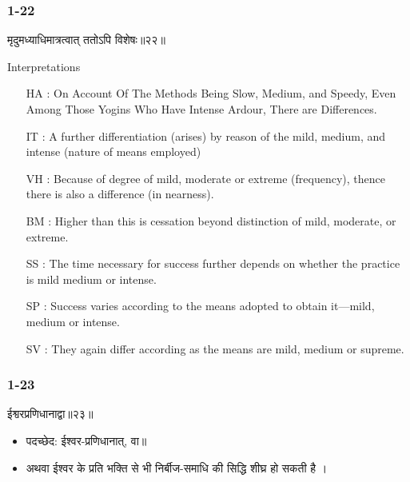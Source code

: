 \begin{frame}[fragile]\frametitle{1-22}
\begin{sanskrit}
मृदुमध्याधिमात्रत्वात् ततोऽपि विशेषः॥२२॥
\end{sanskrit}

Interpretations
\begin{itemize}	
\item [HA]: On Account Of The Methods Being Slow, Medium, and Speedy, Even Among Those Yogins Who Have Intense Ardour, There are Differences.
\item [IT]: A further differentiation (arises) by reason of the mild, medium, and intense (nature of means employed)
\item [VH]: Because of degree of mild, moderate or extreme (frequency), thence there is also a difference (in nearness).
\item [BM]: Higher than this is cessation beyond distinction of mild, moderate, or extreme.
\item [SS]: The time necessary for success further depends on whether the practice is mild medium or intense.
\item [SP]: Success varies according to the means adopted to obtain it—mild, medium or intense.
\item [SV]: They again differ according as the means are mild, medium or supreme. 
\end{itemize}
	
\end{frame}


\begin{frame}[fragile]\frametitle{1-23}
\begin{sanskrit}
ईश्वरप्रणिधानाद्वा॥२३॥
\end{sanskrit}

\begin{itemize}
\item पदच्छेद: ईश्वर-प्रणिधानात्, वा॥
\item अथवा ईश्वर के प्रति भक्ति से भी निर्बीज-समाधि की सिद्धि शीघ्र हो सकती है ।
\end{itemize}
	
\end{frame}


